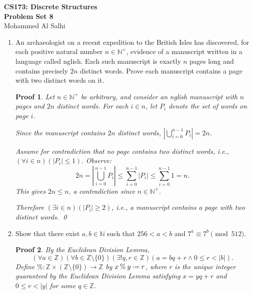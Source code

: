 \documentclass[12pt]{article}
\newcommand{\defeq}{\mathrel{\vcenter{\baselineskip0.5ex \lineskiplimit0pt
                     \hbox{\scriptsize.}\hbox{\scriptsize.}}}=}
\theoremstyle{proofstyle}
\newtheorem*{proof*}{Proof}
\renewcommand{\maketitle}{%
  \begin{flushleft}
    {\Large\bfseries CS173: Discrete Structures}\\[0.3em]
    {\Large\bfseries Problem Set 8}\\[0.5em]
    {\normalsize Mohammed Al Salhi}
  \end{flushleft}
  \vspace{1em}
}
\begin{document}
\maketitle

\begin{enumerate}[left=0pt, itemsep=2em, parsep=1em]

\item An archaeologist on a recent expedition to the British Isles has discovered, for each
positive natural number $n \in \mathbb{N}^{+}$, evidence of a manuscript written in a language
called nglish. Each such manuscript is exactly $n$ pages long and contains precisely $2n$
distinct words. Prove each manuscript contains a page with two distinct words on it.

\begin{proof*}

Let $n \in \mathbb{N}^{+}$ be arbitrary, and consider an nglish manuscript with $n$ pages
and $2n$ distinct words. For each $i \in n$, let $P_i$ denote the set of words on page $i$.

Since the manuscript contains $2n$ distinct words,
$\left|\bigcup_{i=0}^{n-1} P_i\right| = 2n$.

Assume for contradiction that no page contains two distinct words, i.e.,
$(\forall i \in n)(|P_i| \leq 1)$. Observe:
\[
  2n = \left|\bigcup_{i=0}^{n-1} P_i\right| \leq \sum_{i=0}^{n-1} |P_i| \leq \sum_{i=0}^{n-1} 1 = n.
\]
This gives $2n \leq n$, a contradiction since $n \in \mathbb{N}^{+}$.

Therefore $(\exists i \in n)(|P_i| \geq 2)$, i.e., a manuscript contains a page with two
distinct words. \qed

\end{proof*}

\newpage

\item Show that there exist $a, b \in \mathbb{N}$ such that $256 < a < b$ and $7^{a} \equiv 7^{b} \pmod{512}$.

\begin{proof*}
By the Euclidean Division Lemma,
\[
(\forall a \in \mathbb{Z})(\forall b \in \mathbb{Z} \setminus \{0\})(\exists! q, r \in \mathbb{Z})(a = bq + r \land 0 \leq r < |b|).
\]
Define $\mathbin{\%} : \mathbb{Z} \times (\mathbb{Z} \setminus \{0\}) \to \mathbb{Z}$ by
$x \mathbin{\%} y \defeq r$, where $r$ is the unique integer guaranteed by the Euclidean
Division Lemma satisfying $x = yq + r$ and $0 \leq r < |y|$ for some $q \in \mathbb{Z}$.


\end{proof*}
\end{enumerate}
\end{document}
